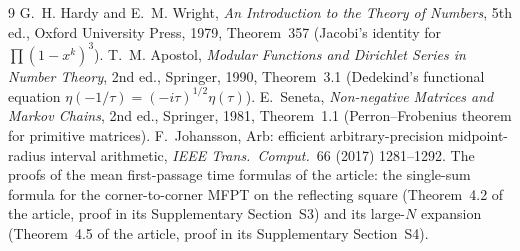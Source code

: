 \documentclass[11pt,a4paper]{article}
\theoremstyle{definition}
\theoremstyle{remark}
\begin{document}
\clearpage
\begin{thebibliography}{9}
 G.~H. Hardy and E.~M. Wright, \emph{An Introduction to the Theory of Numbers}, 5th ed., Oxford University Press, 1979, Theorem~357 (Jacobi's identity for $\prod(1-x^k)^3$).
 T.~M. Apostol, \emph{Modular Functions and Dirichlet Series in Number Theory}, 2nd ed., Springer, 1990, Theorem~3.1 (Dedekind's functional equation $\eta(-1/\tau)=(-i\tau)^{1/2}\eta(\tau)$).
 E.~Seneta, \emph{Non-negative Matrices and Markov Chains}, 2nd ed., Springer, 1981, Theorem~1.1 (Perron--Frobenius theorem for primitive matrices).
 F.~Johansson, Arb: efficient arbitrary-precision midpoint-radius interval arithmetic, \emph{IEEE Trans.\ Comput.}\ 66 (2017) 1281--1292.
 The proofs of the mean first-passage time formulas of the article: the single-sum formula for the corner-to-corner MFPT on the reflecting square (Theorem~4.2 of the article, proof in its Supplementary Section~S3) and its large-$N$ expansion (Theorem~4.5 of the article, proof in its Supplementary Section~S4).
\end{thebibliography}
\end{document}
